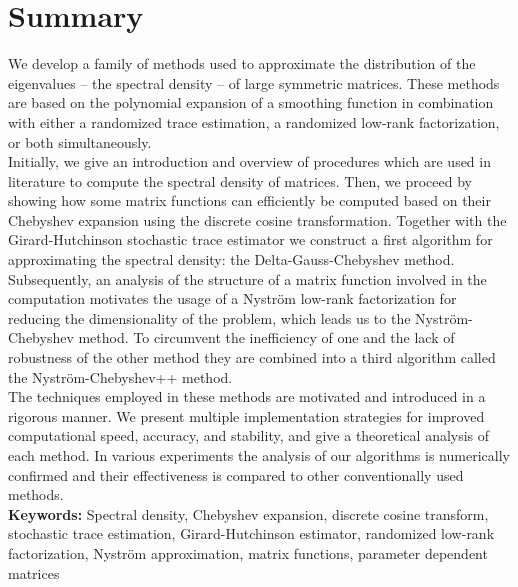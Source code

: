 \chapter*{Summary}
\label{chp:0-summary}

We develop a family of methods used to approximate the distribution of the eigenvalues -- the spectral density --
of large symmetric matrices. These methods are based on the polynomial expansion
of a smoothing function in combination with either a randomized trace estimation,
a randomized low-rank factorization, or both simultaneously.\\

Initially, we give an introduction and overview of procedures which are used in literature
to compute the spectral density of matrices. Then, we proceed by showing how
some matrix functions can efficiently be computed based on
their Chebyshev expansion using the discrete cosine transformation.
Together with the Girard-Hutchinson stochastic trace estimator we construct a first
algorithm for approximating the spectral density: the Delta-Gauss-Chebyshev method.
Subsequently, an analysis of the structure of a matrix function involved in the computation
motivates the usage of a Nystr\"om low-rank factorization for reducing the
dimensionality of the problem, which leads us to the Nystr\"om-Chebyshev method.
To circumvent the inefficiency of one and the lack of robustness of the other
method they are combined into a third algorithm called the
Nystr\"om-Chebyshev++ method.\\

The techniques employed in these methods are motivated and introduced in a
rigorous manner. We present multiple implementation strategies for improved
computational speed, accuracy, and stability, and give a theoretical analysis
of each method. In various experiments the analysis of our algorithms is
numerically confirmed and their effectiveness is compared to other
conventionally used methods.\\

\textbf{Keywords:} Spectral density, Chebyshev expansion, discrete cosine transform, stochastic trace estimation,
Girard-Hutchinson estimator, randomized low-rank factorization, Nystr\"om approximation,
matrix functions, parameter dependent matrices
